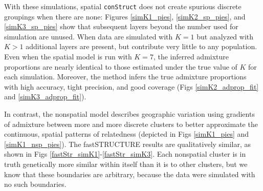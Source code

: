 \documentclass[10pt,letterpaper]{article}
\begin{document}
% 
% 

With these simulations,
spatial \texttt{conStruct} does not create spurious discrete groupings when there are none:
Figures \ref{simK1_pies}, \ref{simK2_sp_pies}, and \ref{simK3_sp_pies} 
show that subsequent layers beyond the number used for simulation are unused.
When data are simulated with $K=1$ but analyzed with $K>1$ 
additional layers are present, but contribute very little to any population.
Even when the spatial model is run with $K=7$, 
the inferred admixture proportions are nearly identical to 
those estimated under the true value of $K$ for each simulation.
Moreover, the method infers the true admixture proportions with high accuracy, tight precision, and good coverage 
(Figs \ref{simK2_adprop_fit} and \ref{simK3_adprop_fit}).

In contrast, the nonspatial model describes geographic variation
using gradients of admixture between more and more discrete clusters
to better approximate the continuous, spatial patterns of relatedness
(depicted in Figs \ref{simK1_pies} and \ref{simK1_nsp_pies}).
The fastSTRUCTURE results are qualitatively similar, as shown in Figs \ref{fastStr_simK1}-\ref{fastStr_simK3}.
Each nonspatial cluster is in truth genetically more similar within itself
than it is to other clusters,
but we know that these boundaries are arbitrary,
because the data were simulated with no such boundaries.
\end{document}
